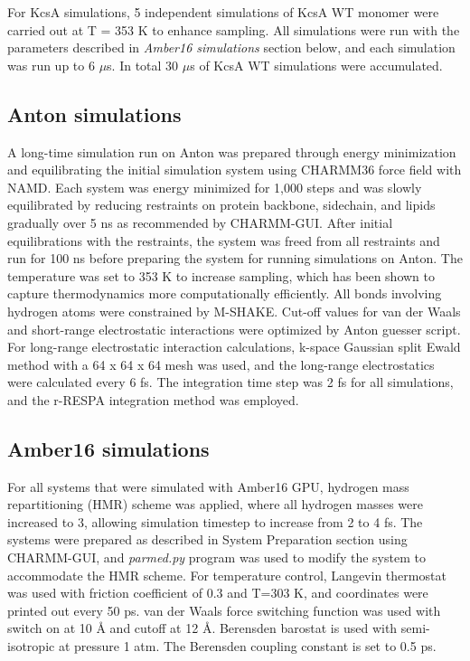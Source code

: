For KcsA simulations, 5 independent simulations of KcsA WT monomer were carried out at T = 353 K to enhance sampling. All simulations were run with the parameters described in \textit{Amber16 simulations} section below, and each simulation was run up to 6 $\mu$s. In total 30 $\mu$s of KcsA WT simulations were accumulated.

\subsection{Anton simulations}
A long-time simulation run on Anton \cite{shaw2009} was prepared through energy minimization and equilibrating the initial simulation system using CHARMM36 force field with NAMD. \cite{phillips2005} Each system was energy minimized for 1,000 steps and was slowly equilibrated by reducing restraints on protein backbone, sidechain, and lipids gradually over 5 ns as recommended by CHARMM-GUI. After initial equilibrations with the restraints, the system was freed from all restraints and run for 100 ns before preparing the system for running simulations on Anton. The temperature was set to 353 K to increase sampling, which has been shown to capture thermodynamics more computationally efficiently. \cite{ulmschneider2014} All bonds involving hydrogen atoms were constrained by M-SHAKE. Cut-off values for van der Waals and short-range electrostatic interactions were optimized by Anton guesser script. For long-range electrostatic interaction calculations, k-space Gaussian split Ewald method with a 64 x 64 x 64 mesh was used, and the long-range electrostatics were calculated every 6 fs. The integration time step was 2 fs for all simulations, and the r-RESPA integration method was employed. \cite{tuckerman1992}

\subsection{Amber16 simulations}
For all systems that were simulated with Amber16 GPU, hydrogen mass repartitioning (HMR) scheme was applied, where all hydrogen masses were increased to 3, allowing simulation timestep to increase from 2 to 4 fs. The systems were prepared as described in System Preparation section using CHARMM-GUI, and \textit{parmed.py} program was used to modify the system to accommodate the HMR scheme. For temperature control, Langevin thermostat was used with friction coefficient of 0.3 and T=303 K, and coordinates were printed out every 50 ps. van der Waals force switching function was used with switch on at 10 Å and cutoff at 12 Å. Berensden barostat is used with semi-isotropic at pressure 1 atm. The Berensden coupling constant is set to 0.5 ps.

